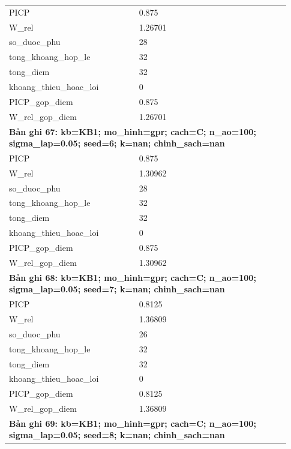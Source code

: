 \begin{longtable}{p{0.43\linewidth}p{0.50\linewidth}}
PICP & 0.875 \\
W\_\allowbreak rel & 1.26701 \\
so\_\allowbreak duoc\_\allowbreak phu & 28 \\
tong\_\allowbreak khoang\_\allowbreak hop\_\allowbreak le & 32 \\
tong\_\allowbreak diem & 32 \\
khoang\_\allowbreak thieu\_\allowbreak hoac\_\allowbreak loi & 0 \\
PICP\_\allowbreak gop\_\allowbreak diem & 0.875 \\
W\_\allowbreak rel\_\allowbreak gop\_\allowbreak diem & 1.26701 \\
\midrule
\multicolumn{2}{p{0.95\linewidth}}{\textbf{Bản ghi 67: kb=KB1; mo\_hinh=gpr; cach=C; n\_ao=100; sigma\_lap=0.05; seed=6; k=nan; chinh\_sach=nan}} \\
PICP & 0.875 \\
W\_\allowbreak rel & 1.30962 \\
so\_\allowbreak duoc\_\allowbreak phu & 28 \\
tong\_\allowbreak khoang\_\allowbreak hop\_\allowbreak le & 32 \\
tong\_\allowbreak diem & 32 \\
khoang\_\allowbreak thieu\_\allowbreak hoac\_\allowbreak loi & 0 \\
PICP\_\allowbreak gop\_\allowbreak diem & 0.875 \\
W\_\allowbreak rel\_\allowbreak gop\_\allowbreak diem & 1.30962 \\
\midrule
\multicolumn{2}{p{0.95\linewidth}}{\textbf{Bản ghi 68: kb=KB1; mo\_hinh=gpr; cach=C; n\_ao=100; sigma\_lap=0.05; seed=7; k=nan; chinh\_sach=nan}} \\
PICP & 0.8125 \\
W\_\allowbreak rel & 1.36809 \\
so\_\allowbreak duoc\_\allowbreak phu & 26 \\
tong\_\allowbreak khoang\_\allowbreak hop\_\allowbreak le & 32 \\
tong\_\allowbreak diem & 32 \\
khoang\_\allowbreak thieu\_\allowbreak hoac\_\allowbreak loi & 0 \\
PICP\_\allowbreak gop\_\allowbreak diem & 0.8125 \\
W\_\allowbreak rel\_\allowbreak gop\_\allowbreak diem & 1.36809 \\
\midrule
\multicolumn{2}{p{0.95\linewidth}}{\textbf{Bản ghi 69: kb=KB1; mo\_hinh=gpr; cach=C; n\_ao=100; sigma\_lap=0.05; seed=8; k=nan; chinh\_sach=nan}} \\

\end{longtable}
